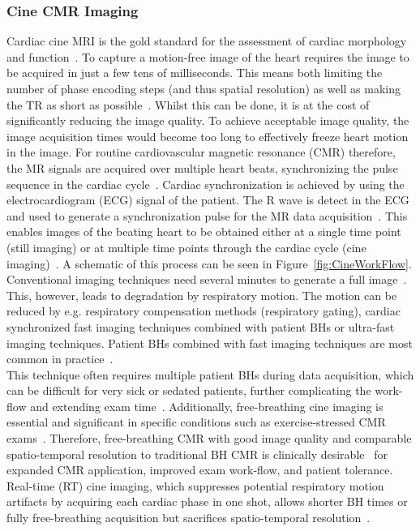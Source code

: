 \subsubsection{Cine CMR Imaging}
Cardiac cine MRI is the gold standard for the assessment of cardiac morphology and function~\cite{KuestnerCINE,Kramer2020}. To capture a motion-free image of the heart requires the image to be acquired in just a few tens of milliseconds. This means both limiting the number of phase encoding steps (and thus spatial resolution) as well as making the TR as short as possible~\cite{CineReview1,CineReview2}. Whilst this can be done, it is at the cost of significantly reducing the image quality. To achieve acceptable image quality, the image acquisition times would become too long to effectively freeze heart motion in the image. For routine cardiovascular magnetic resonance (CMR) therefore, the MR signals are acquired over multiple heart beats, synchronizing the pulse sequence in the cardiac cycle~\cite{Lin2022}. Cardiac synchronization is achieved by using the electrocardiogram (ECG) signal of the patient. The R wave is detect in the ECG and used to generate a synchronization pulse for the MR data acquisition~\cite{Lanzer1985}. This enables images of the beating heart to be obtained either at a single time point (still imaging) or at multiple time points through the cardiac cycle (cine imaging)~\cite{CineReview1}. A schematic of this process can be seen in Figure~\ref{fig:CineWorkFlow}.\\
Conventional imaging techniques need several minutes to generate a full image~\cite{CineReview1}. This, however, leads to degradation by respiratory motion. The motion can be reduced by e.g. respiratory compensation methods (respiratory gating), cardiac synchronized fast imaging techniques combined with patient BHs or ultra-fast imaging techniques. Patient BHs combined with fast imaging techniques are most common in practice~\cite{CineReview1}.\\
This technique often requires multiple patient BHs during data acquisition, which can be difficult for very sick or sedated patients, further complicating the work-flow and extending exam time~\cite{Lin2022}. Additionally, free-breathing cine imaging is essential and significant in specific conditions such as exercise-stressed CMR exams~\cite{Chew2020}. Therefore, free-breathing CMR with good image quality and comparable spatio-temporal resolution to traditional BH CMR is clinically desirable~\cite{Wang2021} for expanded CMR application, improved exam work-flow, and patient tolerance. Real-time (RT) cine imaging, which suppresses potential respiratory motion artifacts by acquiring each cardiac phase in one shot, allows shorter BH times or fully free-breathing acquisition but sacrifices spatio-temporal resolution~\cite{Lin2022}.

